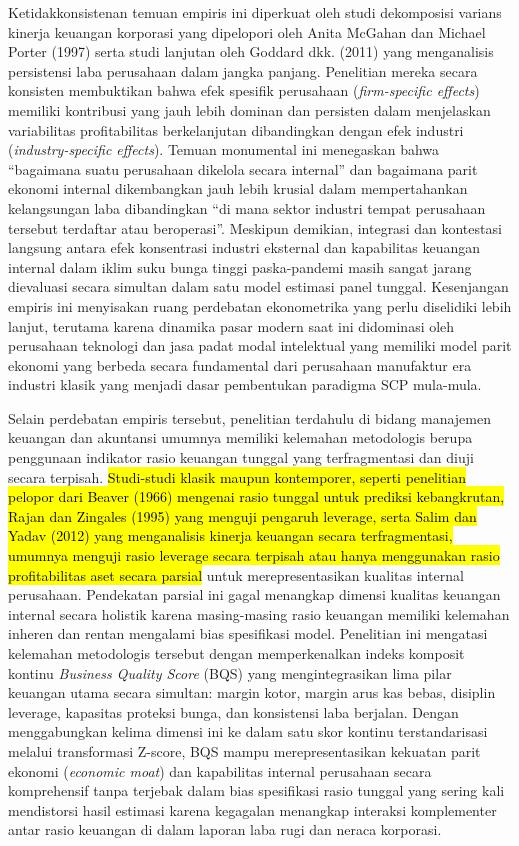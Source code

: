 \documentclass[12pt,a4paper]{article}
\begin{document}
Ketidakkonsistenan temuan empiris ini diperkuat oleh studi dekomposisi
varians kinerja keuangan korporasi yang dipelopori oleh Anita McGahan
dan Michael Porter (1997) serta studi lanjutan oleh Goddard dkk. (2011)
yang menganalisis persistensi laba perusahaan dalam jangka panjang.
Penelitian mereka secara konsisten membuktikan bahwa efek spesifik
perusahaan (\emph{firm-specific effects}) memiliki kontribusi yang jauh
lebih dominan dan persisten dalam menjelaskan variabilitas
profitabilitas berkelanjutan dibandingkan dengan efek industri
(\emph{industry-specific effects}). Temuan monumental ini menegaskan
bahwa ``bagaimana suatu perusahaan dikelola secara internal'' dan
bagaimana parit ekonomi internal dikembangkan jauh lebih krusial dalam
mempertahankan kelangsungan laba dibandingkan ``di mana sektor industri
tempat perusahaan tersebut terdaftar atau beroperasi''. Meskipun
demikian, integrasi dan kontestasi langsung antara efek konsentrasi
industri eksternal dan kapabilitas keuangan internal dalam iklim suku
bunga tinggi paska-pandemi masih sangat jarang dievaluasi secara
simultan dalam satu model estimasi panel tunggal. Kesenjangan empiris
ini menyisakan ruang perdebatan ekonometrika yang perlu diselidiki lebih
lanjut, terutama karena dinamika pasar modern saat ini didominasi oleh
perusahaan teknologi dan jasa padat modal intelektual yang memiliki
model parit ekonomi yang berbeda secara fundamental dari perusahaan
manufaktur era industri klasik yang menjadi dasar pembentukan paradigma
SCP mula-mula.

Selain perdebatan empiris tersebut, penelitian terdahulu di bidang
manajemen keuangan dan akuntansi umumnya memiliki kelemahan metodologis
berupa penggunaan indikator rasio keuangan tunggal yang terfragmentasi
dan diuji secara terpisah.
\hl{Studi-studi klasik maupun kontemporer, seperti penelitian pelopor dari Beaver (1966) mengenai rasio tunggal untuk prediksi kebangkrutan, Rajan dan Zingales (1995) yang menguji pengaruh leverage, serta Salim dan Yadav (2012) yang menganalisis kinerja keuangan secara terfragmentasi, umumnya menguji rasio leverage secara terpisah atau hanya menggunakan rasio profitabilitas aset secara parsial}
untuk merepresentasikan kualitas internal perusahaan. Pendekatan parsial
ini gagal menangkap dimensi kualitas keuangan internal secara holistik
karena masing-masing rasio keuangan memiliki kelemahan inheren dan
rentan mengalami bias spesifikasi model. Penelitian ini mengatasi
kelemahan metodologis tersebut dengan memperkenalkan indeks komposit
kontinu \emph{Business Quality Score} (BQS) yang mengintegrasikan lima
pilar keuangan utama secara simultan: margin kotor, margin arus kas
bebas, disiplin leverage, kapasitas proteksi bunga, dan konsistensi laba
berjalan. Dengan menggabungkan kelima dimensi ini ke dalam satu skor
kontinu terstandarisasi melalui transformasi Z-score, BQS mampu
merepresentasikan kekuatan parit ekonomi (\emph{economic moat}) dan
kapabilitas internal perusahaan secara komprehensif tanpa terjebak dalam
bias spesifikasi rasio tunggal yang sering kali mendistorsi hasil
estimasi karena kegagalan menangkap interaksi komplementer antar rasio
keuangan di dalam laporan laba rugi dan neraca korporasi.
\end{document}
